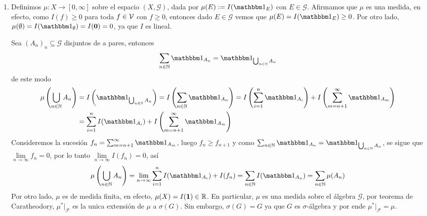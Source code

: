 \documentclass{article}
\begin{document}
\begin{enumerate}
    \item Definimos $\mu:X\to[0,\infty]$ sobre el espacio $(X,\mathcal{G})$, dada por 
    $\mu(E):=I(\I_{E})$ con $E\in\mathcal{G}$. Afirmamos que $\mu$ es una medida, en efecto, como
    $I(f)\geq0$ para toda $f\in\mathcal{V}$ con $f\geq0$, entonces dado $E\in\mathcal{G}$ vemos que 
    $\mu(E)=I(\I_{E})\geq0$. Por otro lado, $\mu(\emptyset)=I(\I_{\emptyset})=I(\textbf{0})=0$,
    ya que $I$ es lineal.
    
    \vspace{4mm}
    \noindent Sea $(A_{n})_{n}\subseteq\mathcal{G}$ disjuntos de a pares, entonces
    \begin{equation*}
        \sum_{n\in\N}\I_{A_{n}}=\I_{\bigcup_{n\in\N}A_{n}}
    \end{equation*}
    de este modo
    \begin{align*}
        \mu\left(\bigcup_{n\in\N}A_{n}\right) &= I\left(\I_{\bigcup_{n\in\N}A_{n}}\right)
        =I\left(\sum_{n\in\N}\I_{A_{n}}\right)=I\left(\sum_{i=1}^{n}\I_{A_{i}}\right)+
        I\left(\sum_{m=n+1}^{\infty}\I_{A_{m}}\right) \\
        &= \sum_{i=1}^{n}I(\I_{A_{i}})+I\left(\sum_{m=n+1}^{\infty}\I_{A_{m}}\right)
    \end{align*}
    Consideremos la sucesión $f_{n}=\sum_{m=n+1}^{\infty}\I_{A_{m}}$, luego $f_{n}\geq f_{n+1}$
    y como $\sum_{n\in\N}\I_{A_{n}}=\I_{\bigcup_{n\in\N}A_{n}}$, se sigue que 
    $\lim\limits_{n\to\infty}f_{n}=0$, por lo tanto $\lim\limits_{n\to\infty}I(f_{n})=0$, así
    \begin{equation*}
        \mu\left(\bigcup_{n\in\N}A_{n}\right)=\lim\limits_{n\to\infty}
        \sum_{i=1}^{n}I(\I_{A_{i}})+I(f_{n})=\sum_{n\in\N}I(\I_{A_{n}})=\sum_{n\in\N}\mu(A_{n})
    \end{equation*}
    Por otro lado, $\mu$ es de medida finita, en efecto, $\mu(X)=I(\textbf{1})\in\mathbb{R}$. En 
    particular, $\mu$ es una medida sobre el álgebra $\mathcal{G}$, por teorema de Caratheodory, 
    $\mu^{*}\big|_{\mathcal{F}}$ es la unica extensión de $\mu$ a $\sigma(G)$. Sin embargo, 
    $\sigma(G)=G$ ya que $G$ es $\sigma$-álgebra y por ende $\mu^{*}\big|_{\mathcal{F}}=\mu$.
    

\end{enumerate}
\end{document}
